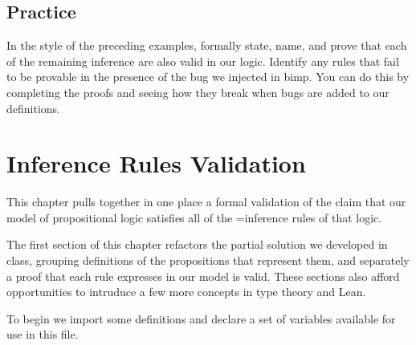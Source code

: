\documentclass[letterpaper,10pt,english]{sphinxmanual}
\begin{document}
\subsection{Practice}
\label{\detokenize{A_01_Propositional_Logic:practice}}
\sphinxAtStartPar
In the style of the preceding examples, formally state,
name, and prove that each of the remaining inference are
also valid in our logic. Identify any rules that fail to be
provable in the presence of the bug we injected in bimp.
You can do this by completing the proofs and seeing how
they break when bugs are added to our definitions.

\begin{sphinxVerbatim}[commandchars=\\\{\}]



 
\end{sphinxVerbatim}

\begin{sphinxVerbatim}[commandchars=\\\{\}]
 
 
\end{sphinxVerbatim}


\section{Inference Rules Validation}
\label{\detokenize{A_01_Propositional_Logic:inference-rules-validation}}
\sphinxAtStartPar
This chapter pulls together in one place a formal
validation of the claim that our model of propositional
logic satisfies all of the =inference rules of that logic.

\sphinxAtStartPar
The first section of this chapter refactors the partial
solution we developed in class, grouping definitions of
the propositions that represent them, and separately a
proof that each rule expresses in our model is valid.
These sections also afford opportunities to intruduce
a few more concepts in type theory and Lean.

\sphinxAtStartPar
To begin we import some definitions and declare a set
of variables available for use in this file.

\begin{sphinxVerbatim}[commandchars=\\\{\}]
 
     
      
\end{sphinxVerbatim}
\end{document}
